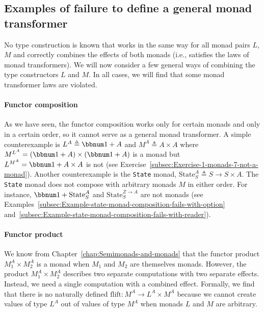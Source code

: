 \subsection{Examples of failure to define a general monad transformer\label{subsec:Examples-of-failure-of-generic-monad-transformer}}

No type construction is known that works in the same way for all monad
pairs $L$, $M$ and correctly combines the effects of both monads
(i.e., satisfies the laws of monad transformers). We will now consider
a few general ways of combining the type constructors $L$ and $M$.
In all cases, we will find that some monad transformer laws are violated.


\paragraph{Functor composition}

As we have seen, the functor composition works only for certain monads
and only in a certain order, so it cannot serve as a general monad
transformer. A simple counterexample is $L^{A}\triangleq\bbnum 1+A$
and $M^{A}\triangleq A\times A$ where $M^{L^{A}}=\left(\bbnum 1+A\right)\times\left(\bbnum 1+A\right)$
is a monad but $L^{M^{A}}=\bbnum 1+A\times A$ is not (see Exercise~\ref{subsec:Exercise-1-monads-7-not-a-monad}).
Another counterexample is the \lstinline!State! monad, $\text{State}_{S}^{A}\triangleq S\rightarrow S\times A$.
The \lstinline!State! monad does not compose with arbitrary monads
$M$ in either order. For instance, $\bbnum 1+\text{State}_{S}^{A}$
and $\text{State}_{S}^{Z\rightarrow A}$ are not monads (see Examples~\ref{subsec:Example-state-monad-composition-fails-with-option}
and~\ref{subsec:Example-state-monad-composition-fails-with-reader}). 

\paragraph{Functor product}

We know from Chapter~\ref{chap:Semimonads-and-monads} that the functor
product $M_{1}^{A}\times M_{2}^{A}$ is a monad when $M_{1}$ and
$M_{2}$ are themselves monads. However, the product $M_{1}^{A}\times M_{2}^{A}$
describes two separate computations with two separate effects. Instead,
we need a single computation with a combined effect. Formally, we
find that there is no naturally defined $\text{flift}:M^{A}\rightarrow L^{A}\times M^{A}$
because we cannot create values of type $L^{A}$ out of values of
type $M^{A}$ when monads $L$ and $M$ are arbitrary.

